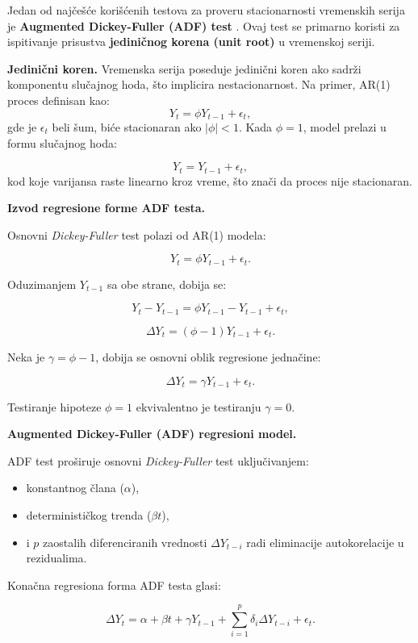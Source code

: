 \documentclass[12pt]{article}
\begin{document}
\noindent Jedan od najčešće korišćenih testova za proveru stacionarnosti vremenskih serija je \textbf{Augmented Dickey-Fuller (ADF) test} \cite{dickey1979, box1970}. Ovaj test se primarno koristi za ispitivanje prisustva \textbf{jediničnog korena (unit root)} u vremenskoj seriji.

\bigskip

\noindent \textbf{Jedinični koren.} Vremenska serija poseduje jedinični koren ako sadrži komponentu slučajnog hoda, što implicira nestacionarnost. Na primer, AR(1) proces definisan kao:
\[
Y_t = \phi Y_{t-1} + \epsilon_t,
\]
gde je $\epsilon_t$ beli šum, biće stacionaran ako $|\phi| < 1$. Kada $\phi = 1$, model prelazi u formu slučajnog hoda:

\[
Y_t = Y_{t-1} + \epsilon_t,
\]
kod koje varijansa raste linearno kroz vreme, što znači da proces nije stacionaran.


\noindent \textbf{Izvod regresione forme ADF testa.}

Osnovni \textit{Dickey-Fuller} test polazi od AR(1) modela:

\[
Y_t = \phi Y_{t-1} + \epsilon_t.
\]

Oduzimanjem $Y_{t-1}$ sa obe strane, dobija se:

\[
Y_t - Y_{t-1} = \phi Y_{t-1} - Y_{t-1} + \epsilon_t,
\]

\[
\Delta Y_t = (\phi - 1) Y_{t-1} + \epsilon_t.
\]

Neka je $\gamma = \phi - 1$, dobija se osnovni oblik regresione jednačine:

\[
\Delta Y_t = \gamma Y_{t-1} + \epsilon_t.
\]

\noindent Testiranje hipoteze $\phi = 1$ ekvivalentno je testiranju $\gamma = 0$.


\noindent \textbf{Augmented Dickey-Fuller (ADF) regresioni model.}

ADF test proširuje osnovni \textit{Dickey-Fuller} test uključivanjem:

\begin{itemize}
    \item konstantnog člana ($\alpha$),
    \item determinističkog trenda ($\beta t$),
    \item i $p$ zaostalih diferenciranih vrednosti $\Delta Y_{t-i}$ radi eliminacije autokorelacije u rezidualima.
\end{itemize}

\noindent Konačna regresiona forma ADF testa glasi:

\[
\Delta Y_t = \alpha + \beta t + \gamma Y_{t-1}
+ \sum_{i=1}^{p} \delta_i \Delta Y_{t-i}
+ \epsilon_t.
\]
\end{document}
